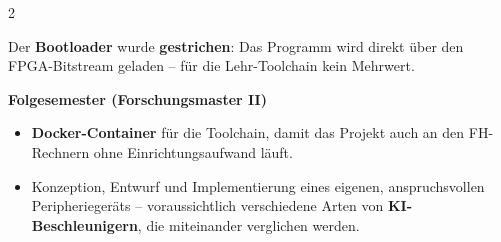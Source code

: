 \documentclass[25pt]{extarticle}
\newcommand{\subheading}[1]{%
  \par\vspace{3mm}%
  {\fontsize{32}{38}\selectfont\bfseries #1}\par\vspace{1mm}%
}
\begin{document}
\begin{multicols}{2}
\smallskip
{\fontsize{24}{30}\selectfont Der \textbf{Bootloader} wurde
\textbf{gestrichen}: Das Programm wird direkt \"uber den FPGA-Bitstream
geladen -- f\"ur die Lehr-Toolchain kein Mehrwert.\par}

\subheading{Folgesemester (Forschungsmaster II)}
\begin{itemize}
  \item \textbf{Docker-Container} f\"ur die Toolchain, damit das Projekt
        auch an den FH-Rechnern ohne Einrichtungsaufwand l\"auft.
  \item Konzeption, Entwurf und Implementierung eines eigenen,
        anspruchsvollen Peripherieger\"ats -- voraussichtlich verschiedene
        Arten von \textbf{KI-Beschleunigern}, die miteinander verglichen
        werden.
\end{itemize}

\end{multicols}
\end{document}
